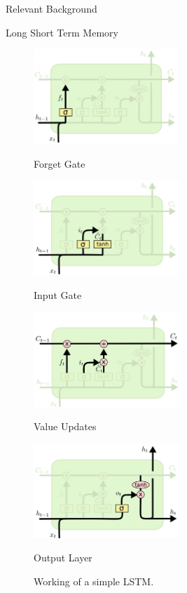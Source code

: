 \documentclass{article}
\begin{document}
\begin{psection}{Relevant Background}
\begin{psubsection}{Long Short Term Memory}
		\begin{figure}[ht!]
			\centering
			\begin{minipage}{0.47\textwidth}
				\centering
				\includegraphics[height=135px]{includes/lstm1.png}
				\caption*{Forget Gate}
			\end{minipage}
			\begin{minipage}{0.47\textwidth}
				\centering
				\includegraphics[height=135px]{includes/lstm2.png}
				\caption*{Input Gate}
			\end{minipage}
			\begin{minipage}{0.47\textwidth}
				\centering
				\includegraphics[height=135px]{includes/lstm3.png}
				\caption*{Value Updates}
			\end{minipage}
			\begin{minipage}{0.47\textwidth}
				\centering
				\includegraphics[height=135px]{includes/lstm4.png}
				\caption*{Output Layer}
			\end{minipage}
			\caption{Working of a simple LSTM. }
			\label{fig:lstm-flow}
		\end{figure}


\end{psubsection}
\end{psection}
\end{document}
